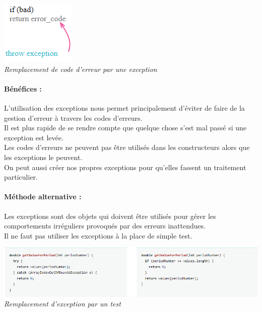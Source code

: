 \documentclass[a4paper,twoside,12pt,openright]{report}
\begin{document}
\begin{center}
\includegraphics[scale=1]{Image/ThrowException.png}\\
\itshape{Remplacement de code d'erreur par une exception \cite{ref8}}
\end{center}

\paragraph{Bénéfices :}
L'utilisation des exceptions nous permet principalement d'éviter de faire de la gestion d'erreur à travers les codes d'erreurs.\\
Il est plus rapide de se rendre compte que quelque chose s'est mal passé si une exception est levée.\\
Les codes d'erreurs ne peuvent pas être utilisés dans les constructeurs alors que les exceptions le peuvent.\\
On peut aussi créer nos propres exceptions pour qu'elles fassent un traitement particulier.\\

\paragraph{Méthode alternative :}
Les exceptions sont des objets qui doivent être utilisés pour gérer les comportements irréguliers provoqués par des erreurs inattendues.\\
Il ne faut pas utiliser les exceptions à la place de simple test.\\

\begin{center}
\includegraphics[scale=0.75]{Image/ExceptionTest.png}\\
\itshape{Remplacement d'exception par un test \cite{ref5}}
\end{center}
\end{document}
